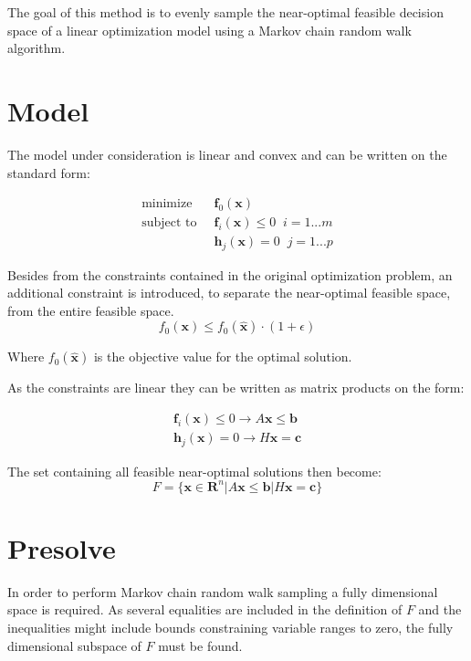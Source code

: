 \documentclass[11pt,a4paper,english]{article}
\begin{document}
	
The goal of this method is to evenly sample the near-optimal feasible decision space of a linear optimization model using a Markov chain random walk algorithm.
	
\section{Model}

The model under consideration is linear and convex and can be written on the standard form: 

\begin{align}\label{eq:ConvexOptimization}
\text{minimize} \;&\; \mathbf{f}_0(\mathbf{x})  \\
	\text{subject to} \; &\; \mathbf{f}_i(\mathbf{x}) \leq 0 \; \; i=1...m\\
\;            &\;  \mathbf{h}_j(\mathbf{x}) = 0 \; \; j=1...p
\end{align}

Besides from the constraints contained in the original optimization problem, an additional constraint is introduced, to separate the near-optimal feasible space, from the entire feasible space. 
\begin{equation}\label{eq:MGA_const}
f_0(\mathbf{x}) \leq f_0(\mathbf{\hat{x}})\cdot (1+\epsilon)
\end{equation}

Where $f_0(\mathbf{\hat{x}})$ is the objective value for the optimal solution. 

As the constraints are linear they can be written as matrix products on the form: 

\begin{align}
\mathbf{f}_i(\mathbf{x}) \leq 0 \to A  \mathbf{x}  \leq \mathbf{b} \\
\mathbf{h}_j(\mathbf{x}) = 0 \to H  \mathbf{x} = \mathbf{c}
\end{align}

The set containing all feasible near-optimal solutions then become:
\begin{equation}
F = \{\mathbf{x} \in \mathbf{R}^n | A  \mathbf{x}  \leq \mathbf{b} | H  \mathbf{x} = \mathbf{c} \}
\end{equation}


\section{Presolve}

In order to perform Markov chain random walk sampling a fully dimensional space is required. As several equalities are included in the definition of $F$ and the inequalities might include bounds constraining variable ranges to zero, the fully dimensional subspace of $F$ must be found.
\end{document}
